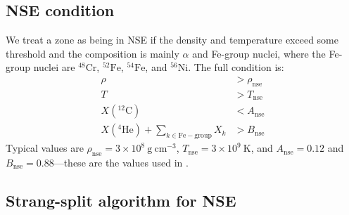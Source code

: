 \documentclass[times,modern]{aastex63}
\newcommand{\isot}[2]{$^{#2}\mathrm{#1}$}
\newcommand{\isotm}[2]{{}^{#2}\mathrm{#1}}
\newcommand{\gcc}{\mathrm{g~cm^{-3} }}
\newcommand{\rhonse}{{\rho_\mathrm{nse}}}
\newcommand{\tnse}{{T_\mathrm{nse}}}
\newcommand{\Anse}{{A_\mathrm{nse}}}
\newcommand{\Bnse}{{B_\mathrm{nse}}}
\begin{document}
\subsection{NSE condition}

We treat a zone as being in NSE if the density and temperature exceed
some threshold and the composition is mainly $\alpha$ and Fe-group
nuclei, where the Fe-group nuclei are \isot{Cr}{48}, \isot{Fe}{52},
\isot{Fe}{54}, and \isot{Ni}{56}.  The full condition is:
\begin{align}
\rho &> \rhonse \\
T &> \tnse \\
X(\isotm{C}{12}) &< \Anse \\
X(\isotm{He}{4}) + \sum_{k \in \mathrm{Fe-group}} X_k &> \Bnse
\end{align}
Typical values are $\rhonse = 3\times 10^8~\gcc$, $T_\mathrm{nse} =
3\times 10^9~\mathrm{K}$, and $\Anse = 0.12$ and $\Bnse=
0.88$---these are the values used in \citet{ma:2013}.

\subsection{Strang-split algorithm for NSE}
\end{document}

